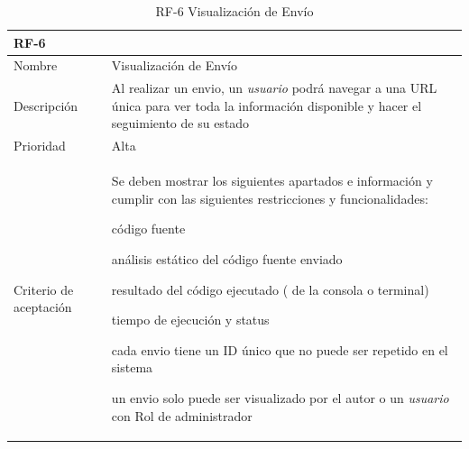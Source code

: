 \documentclass[11pt,spanish,listoffigures,listoftables]{tfgetsinf}
\begin{document}
\begin{table}[ht!]
	\centering
	\begin{tabular}{ |p{4cm}||p{10cm}|  }
		\multicolumn{2}{l}{\textbf{RF-6}} \\
		\hline
		Nombre & Visualización de Envío \\
		\hline
		Descripción & Al realizar un \gls{envio}, un \textit{usuario} podrá navegar a una URL única para ver toda la información disponible y hacer el seguimiento de su estado  \\
		\hline
		Prioridad & Alta\\
		\hline
		Criterio de aceptación & Se deben mostrar los siguientes apartados e información y cumplir con las siguientes restricciones y funcionalidades: \newline  
		\begin{tabitem}
			\item código fuente
			\item análisis estático del código fuente enviado
			\item resultado del código ejecutado (\foreign{english}{output} de la consola o terminal)
			\item tiempo de ejecución y status
			\item cada \gls{envio} tiene un ID único que no puede ser repetido en el sistema
			\item un \gls{envio} solo puede ser visualizado por el autor o un \textit{usuario} con Rol de \gls{administrador} 
		\end{tabitem}  \\
		\hline
	\end{tabular}
	\caption{RF-6 Visualización de Envío}
	\label{table:6}
\end{table}
\end{document}
